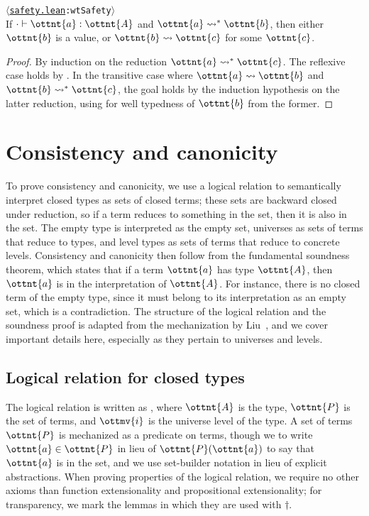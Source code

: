\documentclass[a4paper,UKenglish,cleveref,autoref,thm-restate]{lipics-v2021}
\newcommand{\citep}[1]{\cite{#1}}
\newcommand{\repo}{https://github.com/ionathanch/TTBFL}
\newcommand{\thmref}[2]{%
  $\langle$\href{\repo/tree/main/src/#1}{\texttt{#1}}\texttt{:#2}$\rangle$%
}
\begin{document}
\begin{theorem} \thmref{safety.lean}{wtSafety} \\
  If $  \cdot   \vdash  \ottnt{a}  \mathrel{:}  \ottnt{A} $ and $ \ottnt{a}  \rightsquigarrow^\ast  \ottnt{b} $,
  then either $\ottnt{b}$ is a value,
  or $ \ottnt{b}  \rightsquigarrow  \ottnt{c} $ for some $\ottnt{c}$.
\end{theorem}

\begin{proof}
  By induction on the reduction $ \ottnt{a}  \rightsquigarrow^\ast  \ottnt{c} $.
  The reflexive case holds by .
  In the transitive case where $ \ottnt{a}  \rightsquigarrow  \ottnt{b} $ and $ \ottnt{b}  \rightsquigarrow^\ast  \ottnt{c} $,
  the goal holds by the induction hypothesis on the latter reduction,
  using  for well typedness of $\ottnt{b}$
  from the former.
\end{proof}
\fi

\section{Consistency and canonicity} \label{sec:lr}

To prove consistency and canonicity,
we use a logical relation to semantically interpret closed types as sets of closed terms;
these sets are backward closed under reduction,
so if a term reduces to something in the set, then it is also in the set.
The empty type is interpreted as the empty set,
universes as sets of terms that reduce to types,
and level types as sets of terms that reduce to concrete levels.
Consistency and canonicity then follow from the fundamental soundness theorem,
which states that if a term $\ottnt{a}$ has type $\ottnt{A}$,
then $\ottnt{a}$ is in the interpretation of $\ottnt{A}$.
For instance, there is no closed term of the empty type,
since it must belong to its interpretation as an empty set, which is a contradiction.
The structure of the logical relation and the soundness proof
is adapted from the mechanization by Liu~\citep{lr-pearl},
and we cover important details here,
especially as they pertain to universes and levels.

\subsection{Logical relation for closed types}

The logical relation is written as ,
where $\ottnt{A}$ is the type, $\ottnt{P}$ is the set of terms,
and $\ottmv{i}$ is the universe level of the type.
A set of terms $\ottnt{P}$ is mechanized as a predicate on terms,
though we to write $ \ottnt{a}  \in  \ottnt{P} $ in lieu of $\ottnt{P}(\ottnt{a})$
to say that $\ottnt{a}$ is in the set,
and we use set-builder notation in lieu of explicit abstractions.
When proving properties of the logical relation,
we require no other axioms than function extensionality and propositional extensionality;
for transparency, we mark the lemmas in which they are used with $\dagger$.
\end{document}
